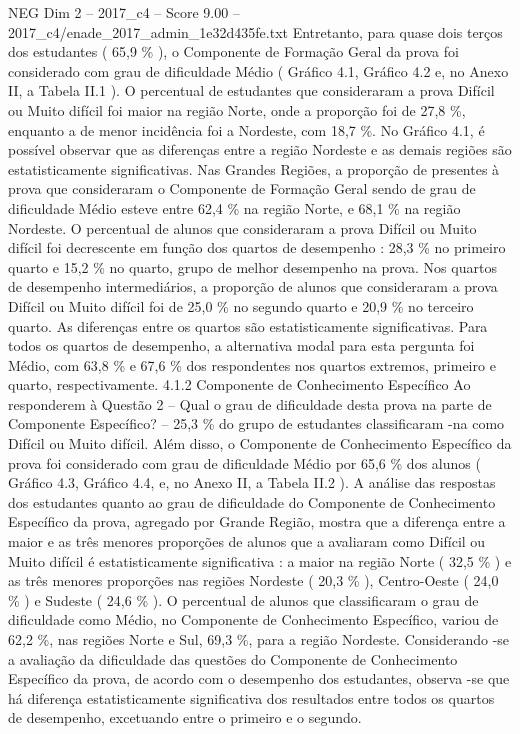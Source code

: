 \begin{textsample}{NEG Dim 2 – 2017\_c4 – Score 9.00 – 2017\_c4/enade\_2017\_admin\_1e32d435fe.txt}
Entretanto, para quase dois terços dos estudantes ( 65,9 \% ), o Componente de Formação Geral da prova foi considerado com grau de dificuldade Médio ( Gráfico 4.1, Gráfico 4.2 e, no Anexo II, a Tabela II.1 ).
O percentual de estudantes que consideraram a prova Difícil ou Muito difícil foi maior na região Norte, onde a proporção foi de 27,8 \%, enquanto a de menor incidência foi a Nordeste, com 18,7 \%.
No Gráfico 4.1, é possível observar que as diferenças entre a região Nordeste e as demais regiões são estatisticamente significativas.
Nas Grandes Regiões, a proporção de presentes à prova que consideraram o Componente de Formação Geral sendo de grau de dificuldade Médio esteve entre 62,4 \% na região Norte, e 68,1 \% na região Nordeste.
O percentual de alunos que consideraram a prova Difícil ou Muito difícil foi decrescente em função dos quartos de desempenho : 28,3 \% no primeiro quarto e 15,2 \% no quarto, grupo de melhor desempenho na prova.
Nos quartos de desempenho intermediários, a proporção de alunos que consideraram a prova Difícil ou Muito difícil foi de 25,0 \% no segundo quarto e 20,9 \% no terceiro quarto.
As diferenças entre os quartos são estatisticamente significativas.
Para todos os quartos de desempenho, a alternativa modal para esta pergunta foi Médio, com 63,8 \% e 67,6 \% dos respondentes nos quartos extremos, primeiro e quarto, respectivamente. 4.1.2 Componente de Conhecimento Específico Ao responderem à Questão 2 – Qual o grau de dificuldade desta prova na parte de Componente Específico? – 25,3 \% do grupo de estudantes classificaram -na como Difícil ou Muito difícil.
Além disso, o Componente de Conhecimento Específico da prova foi considerado com grau de dificuldade Médio por 65,6 \% dos alunos ( Gráfico 4.3, Gráfico 4.4, e, no Anexo II, a Tabela II.2 ).
A análise das respostas dos estudantes quanto ao grau de dificuldade do Componente de Conhecimento Específico da prova, agregado por Grande Região, mostra que a diferença entre a maior e as três menores proporções de alunos que a avaliaram como Difícil ou Muito difícil é estatisticamente significativa : a maior na região Norte ( 32,5 \% ) e as três menores proporções nas regiões Nordeste ( 20,3 \% ), Centro-Oeste ( 24,0 \% ) e Sudeste ( 24,6 \% ).
O percentual de alunos que classificaram o grau de dificuldade como Médio, no Componente de Conhecimento Específico, variou de 62,2 \%, nas regiões Norte e Sul, 69,3 \%, para a região Nordeste.
Considerando -se a avaliação da dificuldade das questões do Componente de Conhecimento Específico da prova, de acordo com o desempenho dos estudantes, observa -se que há diferença estatisticamente significativa dos resultados entre todos os quartos de desempenho, excetuando entre o primeiro e o segundo.

\end{textsample}
